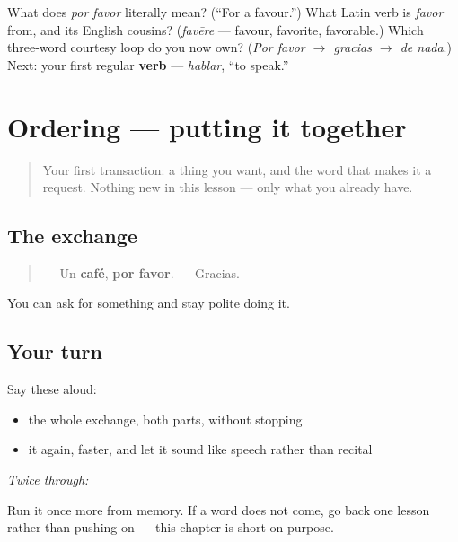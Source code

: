 \begin{tcolorbox}[breakable,colback=teal!4,colframe=teal!35!black,title={Before you move on}]
What does \emph{por favor} literally mean? (\textquotedblleft{}For a favour.\textquotedblright{}) What Latin verb is \emph{favor} from, and its English cousins? (\emph{favēre} — favour, favorite, favorable.) Which three-word courtesy loop do you now own? (\emph{Por favor $\to$ gracias $\to$ de nada}.) Next: your first regular \textbf{verb} — \emph{hablar}, “to speak.”
\end{tcolorbox}
\section[Practice]{Ordering — putting it together}

\label{lesson:ES-C06-repaso-cafe}



\begin{quote}
Your first transaction: a thing you want, and the word that makes it a request. Nothing new in this lesson — only what you already have.
\end{quote}

\subsection*{The exchange}
\begin{quote}
— Un \textbf{café}, \textbf{por favor}. — Gracias.
\end{quote}

\begin{grammarlens}[title={What you've built}]
You can ask for something and stay polite doing it.
\end{grammarlens}

\subsection*{Your turn}
Say these aloud:

\begin{itemize}
\raggedright
  \item the whole exchange, both parts, without stopping
  \item it again, faster, and let it sound like speech rather than recital
\end{itemize}

\emph{Twice through:}

\begin{tcolorbox}[breakable,colback=teal!4,colframe=teal!35!black,title={Before you move on}]
Run it once more from memory. If a word does not come, go back one lesson rather than pushing on — this chapter is short on purpose.
\end{tcolorbox}
